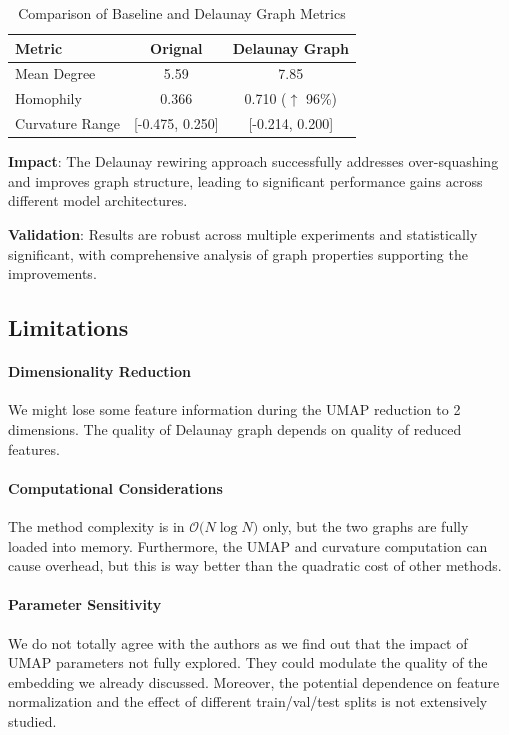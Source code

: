 \documentclass{article}
\theoremstyle{plain}
\theoremstyle{definition}
\theoremstyle{remark}
\begin{document}
\begin{table}[h!]
\caption{Comparison of Baseline and Delaunay Graph Metrics}
\centering
\begin{tabular}{|l|c|c|}
\hline
\textbf{Metric}          & \textbf{Orignal} & \textbf{Delaunay Graph} \\ \hline
Mean Degree              & 5.59                   & 7.85               \\ \hline
Homophily                & 0.366                  & 0.710 ($\uparrow$ 96\%) \\ \hline
Curvature Range          & [-0.475, 0.250]        & [-0.214, 0.200]         \\ \hline
\end{tabular}



\label{tab:graph_comparison}
\end{table}
    
\textbf{Impact}: The Delaunay rewiring approach successfully addresses 
over-squashing and improves graph structure, leading to significant performance 
gains across different model architectures.

\textbf{Validation}: Results are robust across multiple experiments and 
statistically significant, with comprehensive analysis of graph properties
supporting the improvements.

\subsection{Limitations}
\paragraph{Dimensionality Reduction} We might lose some feature information
during the UMAP reduction to 2 dimensions. The quality of Delaunay graph depends
 on quality of reduced features.

 \paragraph{Computational Considerations}
 The method complexity is in $\mathcal{O} \big( N \log N \big)$ only, but the 
 two graphs are  fully loaded into memory. Furthermore, the UMAP and curvature 
 computation can cause overhead, but this is way better than the quadratic cost
 of other methods.
   
\paragraph{Parameter Sensitivity} We do not totally agree with the authors as
we find out that the impact of UMAP parameters not fully explored. They could
modulate the quality of the embedding we already discussed. Moreover, the
potential dependence on feature normalization and the effect of different
 train/val/test splits is not extensively studied.
\end{document}
